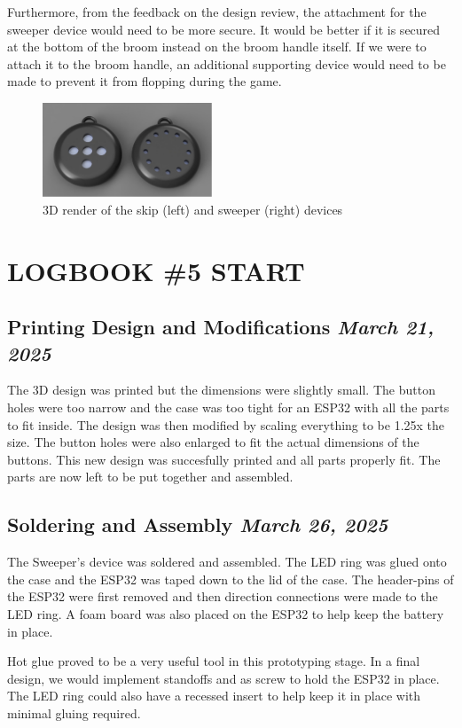 \documentclass{article}
\newcommand{\logbookentry}[2]{
    \subsection*{#1 \hfill \textit{#2}} 
}
\begin{document}
Furthermore, from the feedback on the design review, the attachment for the sweeper device would need to be more secure. It would be better if it is secured at the bottom of the broom instead on the broom handle itself. If we were to attach it to the broom handle, an additional supporting device would need to be made to prevent it from flopping during the game.
\begin{figure}[ht!]
    \centering
    \includegraphics[width=0.45\textwidth]{design_renders.png}
    \caption{3D render of the skip (left) and sweeper (right) devices}
    \label{fig:3d_render}
\end{figure}

\section{LOGBOOK \#5 START}

\logbookentry{Printing Design and Modifications}{March 21, 2025}

The 3D design was printed but the dimensions were slightly small. The button holes were too narrow and the case was too tight for an ESP32 with all the parts to fit inside. The design was then modified by scaling everything to be 1.25x the size. The button holes were also enlarged to fit the actual dimensions of the buttons. This new design was succesfully printed and all parts properly fit. The parts are now left to be put together and assembled.

\logbookentry{Soldering and Assembly}{March 26, 2025}
The Sweeper's device was soldered and assembled. The LED ring was glued onto the case and the ESP32 was taped down to the lid of the case. The header-pins of the ESP32 were first removed and then direction connections were made to the LED ring. A foam board was also placed on the ESP32 to help keep the battery in place.

Hot glue proved to be a very useful tool in this prototyping stage. In a final design, we would implement standoffs and as screw to hold the ESP32 in place. The LED ring could also have a recessed insert to help keep it in place with  minimal gluing required.
\end{document}
